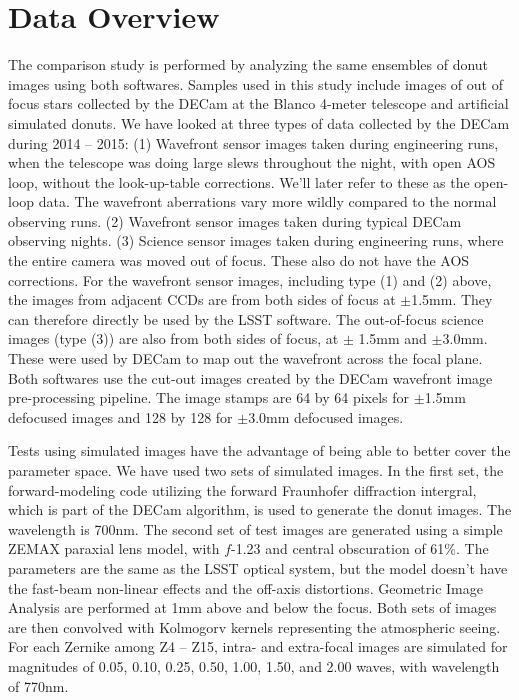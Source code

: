 \documentclass[]{spie}  %
\begin{document}
\section{Data Overview}
\label{sec:data}

The comparison study is performed by analyzing the same ensembles of donut images using both softwares.
Samples used in this study include images of out of focus stars collected by the DECam at the Blanco 4-meter telescope and artificial simulated donuts. 
We have looked at three types of data collected by the DECam during 2014 -- 2015: (1) Wavefront sensor images taken during engineering runs, when the telescope was doing large slews throughout the night, with open AOS loop, without the look-up-table corrections. We'll later refer to these as the open-loop data.
The wavefront aberrations vary more wildly compared to the normal observing runs.  
(2) Wavefront sensor images taken during typical DECam observing nights. 
(3) Science sensor images taken during engineering runs, where the entire camera was moved out of focus. 
These also do not have the AOS corrections.
For the wavefront sensor images, including type (1) and (2) above, the images from adjacent CCDs are from both sides of focus at $\pm$1.5mm. They can therefore directly be used by the LSST software.
The out-of-focus science images (type (3)) are also from both sides of focus, at $\pm$ 1.5mm and $\pm$3.0mm. These were used by DECam to map out the wavefront across the focal plane.
Both softwares use the cut-out images created by the DECam wavefront image pre-processing pipeline.
The image stamps are 64 by 64 pixels for $\pm$1.5mm defocused images and 128 by 128 for $\pm$3.0mm defocused images.

Tests using simulated images have the advantage of being able to better cover the parameter space.
We have used two sets of simulated images. 
In the first set, the forward-modeling code utilizing the forward Fraunhofer diffraction intergral, which is part of the DECam algorithm, is used to generate the donut images. The wavelength is 700nm.
The second set of test images are generated using a simple ZEMAX paraxial lens model, with $f$-1.23 and central obscuration of 61\%. The parameters are the same as the LSST optical system, but the model doesn't have the fast-beam non-linear effects and the off-axis distortions. 
Geometric Image Analysis are performed at 1mm above and below the focus.
Both sets of images are then convolved with Kolmogorv kernels representing the atmospheric seeing.
For each Zernike among Z4 -- Z15, intra- and extra-focal images are simulated for magnitudes of 
0.05, 0.10, 0.25, 0.50, 1.00, 1.50, and 2.00 waves, with wavelength of 770nm.
\end{document}

